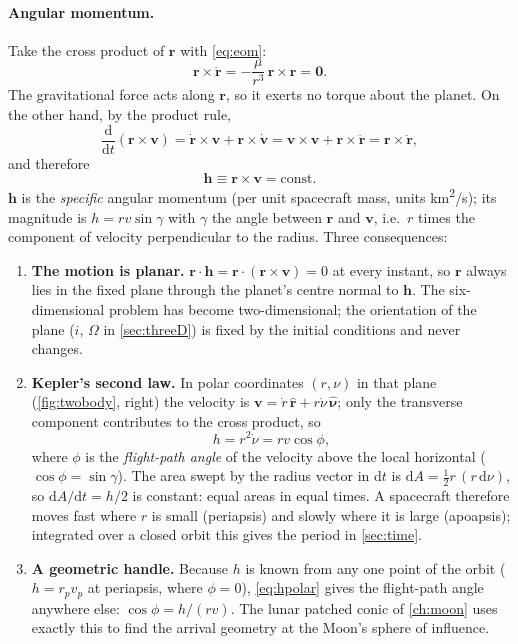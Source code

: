 \documentclass[11pt,letterpaper,oneside]{report}
\newcommand{\dd}{\mathrm{d}}
\newcommand{\bv}[1]{\bm{#1}}
\newcommand{\uv}[1]{\hat{\bm{#1}}}
\begin{document}
\paragraph{Angular momentum.} Take the cross product of $\bv r$ with \cref{eq:eom}:
\[
  \bv r\times\ddot{\bv r} = -\frac{\mu}{r^3}\,\bv r\times\bv r = \bv 0 .
\]
The gravitational force acts along $\bv r$, so it exerts no torque about the planet. On the other
hand, by the product rule,
\[
  \frac{\dd}{\dd t}(\bv r\times\bv v)=\dot{\bv r}\times\bv v+\bv r\times\dot{\bv v}
  =\bv v\times\bv v+\bv r\times\ddot{\bv r}=\bv r\times\ddot{\bv r},
\]
and therefore
\begin{equation}
  \bv h \equiv \bv r\times\bv v = \text{const}.
  \label{eq:angmom}
\end{equation}
$\bv h$ is the \emph{specific} angular momentum (per unit spacecraft mass, units \si{km^2/s}); its
magnitude is $h=rv\sin\gamma$ with $\gamma$ the angle between $\bv r$ and $\bv v$, i.e.\ $r$ times
the component of velocity perpendicular to the radius. Three consequences:
\begin{enumerate}[nosep]
\item \textbf{The motion is planar.} $\bv r\cdot\bv h=\bv r\cdot(\bv r\times\bv v)=0$ at every
      instant, so $\bv r$ always lies in the fixed plane through the planet's centre normal to
      $\bv h$. The six-dimensional problem has become two-dimensional; the orientation of the plane
      ($i$, $\Omega$ in \cref{sec:threeD}) is fixed by the initial conditions and never changes.
\item \textbf{Kepler's second law.} In polar coordinates $(r,\nu)$ in that plane
      (\cref{fig:twobody}, right) the velocity is $\bv v=\dot r\,\uv r+r\dot\nu\,\uv\nu$; only the
      transverse component contributes to the cross product, so
      \begin{equation}
        h=r^2\dot\nu=rv\cos\phi ,
        \label{eq:hpolar}
      \end{equation}
      where $\phi$ is the \emph{flight-path angle} of the velocity above the local horizontal
      ($\cos\phi=\sin\gamma$). The area swept by the radius vector in $\dd t$ is
      $\dd A=\tfrac12 r\,(r\,\dd\nu)$, so $\dd A/\dd t=h/2$ is constant: equal areas in equal
      times. A spacecraft therefore moves fast where $r$ is small (periapsis) and slowly where it is
      large (apoapsis); integrated over a closed orbit this gives the period in \cref{sec:time}.
\item \textbf{A geometric handle.} Because $h$ is known from any one point of the orbit
      ($h=r_pv_p$ at periapsis, where $\phi=0$), \cref{eq:hpolar} gives the flight-path angle
      anywhere else: $\cos\phi=h/(rv)$. The lunar patched conic of \cref{ch:moon} uses exactly this
      to find the arrival geometry at the Moon's sphere of influence.
\end{enumerate}
\end{document}

